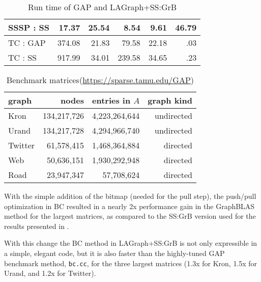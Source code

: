 \begin{table}
\begin{center}
\begin{tabular}{|l|rrrrr|}
SSSP : SS      &  17.37    &  25.54    &   8.54     &  9.61   &   46.79  \\     %
\hline
TC   : GAP     & 374.08    &  21.83    &  79.58     & 22.18   &     .03  \\
TC   : SS      & 917.99    &  34.01    & 239.58     & 34.65   &     .23  \\     %
\hline
\end{tabular}
\caption{Run time of GAP and LAGraph+SS:GrB
\label{table:results}}
\end{center}
\end{table}

\begin{table}
\begin{center}
\begin{tabular}{|l|rrr|}
\hline
graph   & nodes        & entries in $A$ & graph kind \\
\hline
Kron    & 134,217,726 &  4,223,264,644 &  undirected   \\
Urand   & 134,217,728 &  4,294,966,740 &  undirected   \\
Twitter &  61,578,415 &  1,468,364,884 &  directed     \\
Web     &  50,636,151 &  1,930,292,948 &  directed     \\
Road    &  23,947,347 &     57,708,624 &  directed     \\
\hline
\end{tabular}
\caption{Benchmark matrices\label{table:matrices}
(\url{https://sparse.tamu.edu/GAP})}
\end{center}
\end{table}


With the simple addition of the bitmap (needed for the pull step), the
push/pull optimization in BC resulted in a nearly 2x performance gain in the
GraphBLAS method for the largest matrices, as compared to the SS:GrB version
used for the results presented in \cite{DBLP:conf/iiswc/AzadABBCDDDDFGG20}.

With this change the BC method in LAGraph+SS:GrB is not only expressible in a
simple, elegant code, but it is also faster than the highly-tuned GAP benchmark
method, \verb'bc.cc', for the three largest matrices (1.3x for Kron, 1.5x for
Urand, and 1.2x for Twitter).

